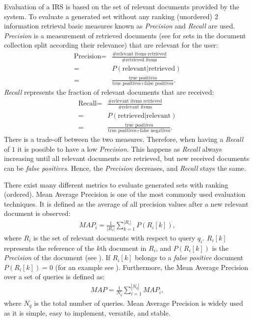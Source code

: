 Evaluation of a IRS is based on the set of relevant documents provided by the system. To evaluate a generated set without any ranking (unordered) $2$ information retrieval basic measures known as \textit{Precision} and \textit{Recall} are used. \textit{Precision} is a measurement of retrieved documents (see  for sets in the document collection split according their relevance) that are relevant for the user:
\begin{align}
  \label{precision}
  \text{Precision} = & \frac{\text{\# relevant items retrieved}}{\text{\# retrieved items}} \nonumber \\
    = & P(\text{relevant} | \text{retrieved}) \nonumber \\
    = & \frac{\text{true positives}}{\text{true positives} + \text{false positives}}.
\end{align}
\textit{Recall} represents the fraction of relevant documents that are received:
\begin{align}
  \text{Recall} = & \frac{\text{\# relevant items retrieved}}{\text{\# relevant items}} \nonumber \\
    = & P(\text{retrieved} | \text{relevant}) \nonumber \\
    = & \frac{\text{true positives}}{\text{true positives} + \text{false negatives}}.
\end{align}
There is a trade-off between the two measures. Therefore, when having a \textit{Recall} of $1$ it is possible to have a low \textit{Precision}. This happens as \textit{Recall} always increasing until all relevant documents are retrieved, but new received documents can be \textit{false positives}. Hence, the \textit{Precision} decreases, and \textit{Recall} stays the same.

There exist many different metrics to evaluate generated sets with ranking (ordered). Mean Average Precision is one of the most commonly used evaluation techniques. It is defined as the average of all precision values after a new relevant document is observed:
\begin{align}
  \label{map_of_a_single_query}
  \mathit{MAP}_i = \frac{1}{|R_i|}\sum_{k = 1}^{|R_i|} P(R_i[k]),
\end{align}
where $R_i$ is the set of relevant documents with respect to query $q_i$. $R_i[k]$ represents the reference of the $k$th document in $R_i$, and $P(R_i[k])$ is the \textit{Precision} of the document (see ). If $R_i[k]$ belongs to a \textit{false positive} document $P(R_i[k]) = 0$ (for an example see ). Furthermore, the Mean Average Precision over a set of queries is defined as:
\begin{align}
  \mathit{MAP} = \frac{1}{N_q}\sum_{i = 1}^{|N_q|} \mathit{MAP}_i,
\end{align}
where $N_q$ is the total number of queries. Mean Average Precision is widely used as it is simple, easy to implement, versatile, and stable.

